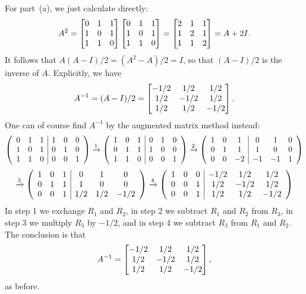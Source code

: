 \documentclass[a4paper]{book}
\theoremstyle{definition}
\renewenvironment{solution}{\SolutionInline}{\endSolutionInline}
\begin{document}
\begin{solution}
 For part~(a), we just calculate directly:
 \[ A^2 = \begin{bmatrix} 0&1&1\\1&0&1\\1&1&0 \end{bmatrix}
          \begin{bmatrix} 0&1&1\\1&0&1\\1&1&0 \end{bmatrix}
        = \begin{bmatrix} 2&1&1\\1&2&1\\1&1&2 \end{bmatrix}
        = A + 2I.
 \]
 It follows that $A(A-I)/2=(A^2-A)/2=I$, so that $(A-I)/2$ is the
 inverse of $A$.  Explicitly, we have
 \[ A^{-1} = (A-I)/2 =
     \begin{bmatrix} -1/2 &  1/2 &  1/2 \\
           1/2 & -1/2 &  1/2 \\
           1/2 &  1/2 & -1/2 \end{bmatrix}.
 \]
 One can of course find $A^{-1}$ by the augmented matrix method
 instead:
 \[
  \left(\begin{array}{ccc|ccc}
   0&1&1&1&0&0 \\ 1&0&1&0&1&0 \\ 1&1&0&0&0&1
  \end{array}\right) \xrightarrow{1}
  \left(\begin{array}{ccc|ccc}
   1&0&1&0&1&0 \\ 0&1&1&1&0&0 \\ 1&1&0&0&0&1
  \end{array}\right)   \xrightarrow{2}
  \left(\begin{array}{ccc|ccc}
   1&0&1&0&1&0 \\ 0&1&1&1&0&0 \\ 0&0&-2&-1&-1&1
  \end{array}\right)
 \] \[  \xrightarrow{3}
  \left(\begin{array}{ccc|ccc}
   1&0&1&0&1&0 \\ 0&1&1&1&0&0 \\ 0&0&1&1/2&1/2&-1/2
  \end{array}\right) \xrightarrow{4}
  \left(\begin{array}{ccc|ccc}
   1&0&0&-1/2&1/2&1/2 \\ 0&0&1&1/2&-1/2&1/2 \\ 0&0&1&1/2&1/2&-1/2
  \end{array}\right)
 \]
 In step 1 we exchange $R_1$ and $R_2$, in step 2 we subtract $R_1$
 and $R_2$ from $R_3$, in step 3 we multiply $R_3$ by $-1/2$, and in
 step 4 we subtract $R_3$ from $R_1$ and $R_2$.  The conclusion is
 that
 \[ A^{-1} =
     \begin{bmatrix} -1/2 &  1/2 &  1/2 \\
           1/2 & -1/2 &  1/2 \\
           1/2 &  1/2 & -1/2 \end{bmatrix},
 \]
 as before.
\end{solution}
\end{document}
